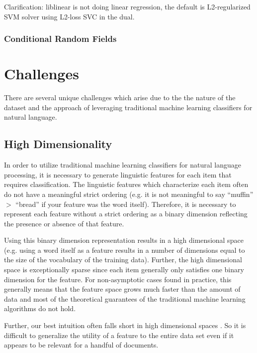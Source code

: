 \documentclass[preprint]{style}
\begin{document}
Clarification: liblinear is not doing linear regression, the default is L2-regularized SVM solver using L2-loss SVC in the dual.

\subsubsection{Conditional Random Fields}

\section{Challenges}
There are several unique challenges which arise due to the the nature of the dataset and the approach of leveraging traditional machine learning classifiers for natural language.

\subsection{High Dimensionality}
In order to utilize traditional machine learning classifiers for natural language processing, it is necessary to generate linguistic features for each item that requires classification. The linguistic features which characterize each item often do not have a meaningful strict ordering (e.g. it is not meaningful to say ``muffin'' $>$ ``bread'' if your feature was the word itself). Therefore, it is necessary to represent each feature without a strict ordering as a binary dimension reflecting the presence or absence of that feature.

Using this binary dimension representation results in a high dimensional space (e.g. using a word itself as a feature results in a number of dimensions equal to the size of the vocabulary of the training data). Further, the high dimensional space is exceptionally sparse since each item generally only satisfies one binary dimension for the feature. For non-asymptotic cases found in practice, this generally means that the feature space grows much faster than the amount of data and most of the theoretical guarantees of the traditional machine learning algorithms do not hold.

Further, our best intuition often falls short in high dimensional spaces \cite{dimensions}. So it is difficult to generalize the utility of a feature to the entire data set even if it appears to be relevant for a handful of documents.
\end{document}
